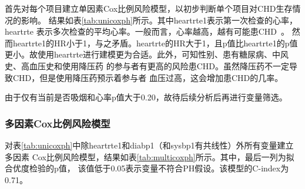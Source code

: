 \documentclass[lang=cn,11pt,a4paper,cite=super,AutoFakeBold]{elegantpaper}
\begin{document}
首先对每个项目建立单因素Cox比例风险模型，以初步判断单个项目对CHD生存情况的影响。
结果如表\ref{tab:unicoxph}所示。其中heartrte1表示第一次检查的心率，heartrte
表示多次检查的平均心率。一般而言，心率越高，越有可能患CHD~\cite{2blood}。
然而heartrte1的HR小于1，与之矛盾。heartrte的HR大于1，且p值比heartrte1的p值
更小。故使用heartrte进行建模更为合适。此外，可知性别、患有糖尿病、中风史、高血压史和使用降压药
的参与者有更高的风险患CHD。虽然降压药不一定导致CHD，但是使用降压药预示着参与者
血压过高，这会增加患CHD的几率。

由于仅有当前是否吸烟和心率p值大于0.20，故待后续分析后再进行变量筛选。

\subsubsection{多因素Cox比例风险模型}
对表\ref{tab:unicoxph}中除heartrte1和diabp1（和sysbp1有共线性）外所有变量建立多因素
Cox比例风险模型，结果如表\ref{tab:multicoxph}所示。其中，最后一列为拟合优度检验的p值，
该值低于0.05表示变量不符合PH假设。该模型的C-index为0.71。
\end{document}
